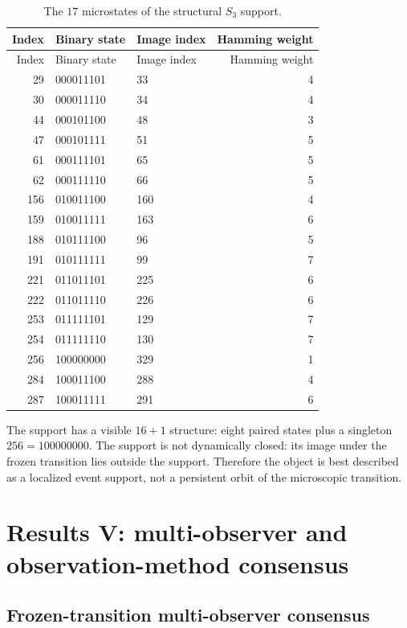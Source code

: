\documentclass[11pt]{article}
\begin{document}
\begin{longtable}{rllr}
\caption{The $17$ microstates of the structural $S_3$ support.}\label{tab:support}\\
\toprule
Index & Binary state & Image index & Hamming weight \\
\midrule
\endfirsthead
\toprule
Index & Binary state & Image index & Hamming weight \\
\midrule
\endhead
29 & 000011101 & 33 & 4 \\
30 & 000011110 & 34 & 4 \\
44 & 000101100 & 48 & 3 \\
47 & 000101111 & 51 & 5 \\
61 & 000111101 & 65 & 5 \\
62 & 000111110 & 66 & 5 \\
156 & 010011100 & 160 & 4 \\
159 & 010011111 & 163 & 6 \\
188 & 010111100 & 96 & 5 \\
191 & 010111111 & 99 & 7 \\
221 & 011011101 & 225 & 6 \\
222 & 011011110 & 226 & 6 \\
253 & 011111101 & 129 & 7 \\
254 & 011111110 & 130 & 7 \\
256 & 100000000 & 329 & 1 \\
284 & 100011100 & 288 & 4 \\
287 & 100011111 & 291 & 6 \\
\bottomrule
\end{longtable}

The support has a visible $16+1$ structure: eight paired states plus a singleton $256=100000000$.  The support is not dynamically closed: its image under the frozen transition lies outside the support.  Therefore the object is best described as a localized event support, not a persistent orbit of the microscopic transition.

\section{Results V: multi-observer and observation-method consensus}

\subsection{Frozen-transition multi-observer consensus}
\end{document}
